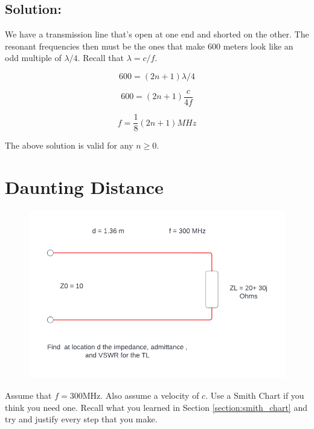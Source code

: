 \documentclass{article}
\begin{document}
\subsection{Solution:}

We have a transmission line that's open at one end and shorted on the other. The resonant frequencies then must be the ones that make $600$ meters look like an odd multiple of $\lambda/4$. Recall that $\lambda = c/f$.

$$600 = (2n + 1) \lambda/4$$

$$600 = (2n + 1) \frac{c}{4f}$$

$$\boxed{f = \frac{1}{8} (2n + 1) MHz}$$

The above solution is valid for any $n \geq 0$.

\section{Daunting Distance}

\begin{figure}[H]
\begin{center}
    \includegraphics[width= 0.7
    \textwidth]{figures/VSWR Example.png}
\end{center}
\end{figure}

Assume that $f = 300$MHz. Also assume a velocity of $c$. Use a Smith Chart if you think you need one. Recall what you learned in Section \ref{section:smith_chart} and try and justify every step that you make.
\end{document}
